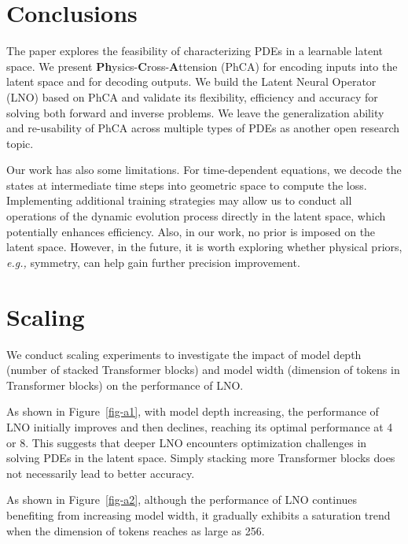 \documentclass{article}
\begin{document}
\section{Conclusions}
\label{conclusion}
The paper explores the feasibility of characterizing PDEs in a learnable latent space. We present \textbf{Ph}ysics-\textbf{C}ross-\textbf{A}ttension (PhCA) for encoding inputs into the latent space and for decoding outputs. We build the Latent Neural Operator (LNO) based on PhCA and validate its flexibility, efficiency and accuracy for solving both forward and inverse problems. We leave the generalization ability and re-usability of PhCA across multiple types of PDEs as another open research topic. 

Our work has also some limitations. For time-dependent equations, we decode the states at intermediate time steps into geometric space to compute the loss. Implementing additional training strategies may allow us to conduct all operations of the dynamic evolution process directly in the latent space, which potentially enhances efficiency. Also, in our work, no prior is imposed on the latent space. However, in the future, it is worth exploring whether physical priors, {\em e.g.,} symmetry, can help gain further precision improvement. 

\newpage
{\small

%

}

\newpage
\appendix

\section{Scaling}
\label{appendix-A}
We conduct scaling experiments to investigate the impact of model depth (number of stacked Transformer blocks) and model width (dimension of tokens in Transformer blocks) on the performance of LNO. 

As shown in Figure~\ref{fig-a1}, with model depth increasing, the performance of LNO initially improves and then declines, reaching its optimal performance at 4 or 8. This suggests that deeper LNO encounters optimization challenges in solving PDEs in the latent space. Simply stacking more Transformer blocks does not necessarily lead to better accuracy. %

As shown in Figure~\ref{fig-a2}, although the performance of LNO continues benefiting from increasing model width, it gradually exhibits a saturation trend when the dimension of tokens reaches as large as 256.
\end{document}
